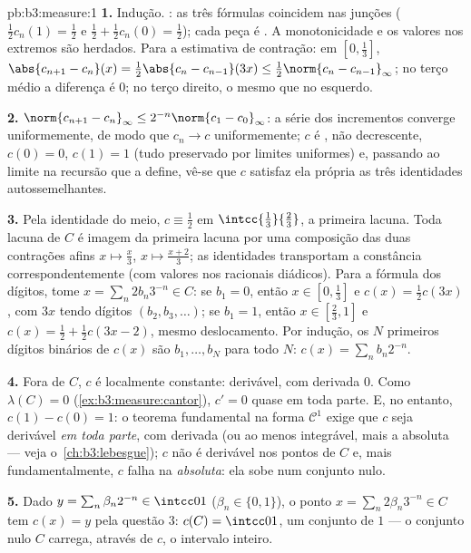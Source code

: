 \begin{solution}{pb:b3:measure:1}
\textbf{1.} Indução. : as três fórmulas coincidem nas
junções ($\frac12c_n(1) = \frac12$ e $\frac12 +
\frac12c_n(0) = \frac12$); cada peça é .
A monotonicidade e os valores nos extremos são herdados. Para a
estimativa de contração: em $[0,\frac13]$, $\abs{c_{n+1} - c_n}(x)
= \frac12\abs{c_n - c_{n-1}}(3x) \leq \frac12\norm{c_n -
c_{n-1}}_\infty$; no terço médio a diferença é $0$; no
terço direito, o mesmo que no esquerdo.

\textbf{2.} $\norm{c_{n+1} - c_n}_\infty \leq
2^{-n}\norm{c_1 - c_0}_\infty$: a série dos incrementos
converge uniformemente, de modo que $c_n \to c$ uniformemente; $c$ é
, não decrescente, $c(0) = 0$, $c(1) = 1$ (tudo
preservado por limites uniformes) e, passando ao limite na
recursão que a define, vê-se que $c$ satisfaz ela própria as três
identidades autossemelhantes.

\textbf{3.} Pela identidade do meio, $c \equiv \frac12$ em
$\intcc{\frac13}{\frac23}$, a primeira lacuna. Toda lacuna de $C$ é
imagem da primeira lacuna por uma composição das duas
contrações afins $x \mapsto \frac x3$, $x\mapsto\frac{x +
2}3$; as identidades transportam a constância correspondentemente (com
valores nos racionais diádicos). Para a fórmula dos dígitos, tome $x =
\sum_n 2b_n3^{-n} \in C$: se $b_1 = 0$, então $x \in
[0,\frac13]$ e $c(x) = \frac12c(3x)$, com $3x$ tendo dígitos
$(b_2, b_3, \dots)$; se $b_1 = 1$, então $x \in [\frac23, 1]$
e $c(x) = \frac12 + \frac12c(3x - 2)$, mesmo deslocamento. Por
indução, os $N$ primeiros dígitos binários de $c(x)$ são $b_1,
\dots, b_N$ para todo $N$: $c(x) = \sum_nb_n2^{-n}$.

\textbf{4.} Fora de $C$, $c$ é localmente constante: derivável,
com derivada $0$. Como $\lambda(C) = 0$
(\cref{ex:b3:measure:cantor}), $c' = 0$ quase em toda parte. E, no entanto,
$c(1) - c(0) = 1$: o teorema fundamental na forma $\mathcal
C^1$ exige que $c$ seja derivável \emph{em toda parte},
com derivada  (ou ao menos integrável, mais a 
absoluta --- veja o~\cref{ch:b3:lebesgue}); $c$ não é
derivável nos pontos de $C$ e, mais fundamentalmente, $c$
falha na \emph{ absoluta}: ela sobe num conjunto nulo.

\textbf{5.} Dado $y = \sum_n\beta_n2^{-n} \in \intcc01$
($\beta_n \in \{0,1\}$), o ponto $x = \sum_n2\beta_n3^{-n}
\in C$ tem $c(x) = y$ pela questão 3: $c(C) = \intcc01$, um conjunto
de  $1$ --- o conjunto nulo $C$ carrega, através de $c$, o
intervalo inteiro.


\end{solution}
